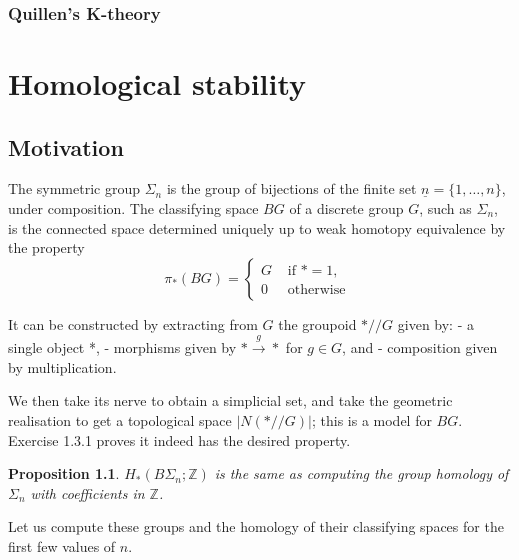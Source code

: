 \documentclass{book}
\newtheorem{prop}{Proposition}
\begin{document}
\section{Quillen's K-theory}


\part{Homological stability}
\chapter{Motivation}


\cite{kupersHomologicalStabilityMinicourse2021}

The symmetric group $\Sigma_n$ is the group of bijections of the finite set $\underline{n}=\{1, \ldots, n\}$, under composition. The classifying space $B G$ of a discrete group $G$, such as $\Sigma_n$, is the connected space determined uniquely up to weak homotopy equivalence by the property
$$
\pi_*(B G)= \begin{cases}G & \text { if } *=1, \\ 0 & \text { otherwise }\end{cases}
$$

It can be constructed by extracting from $G$ the groupoid $* / / G$ given by:
- a single object *,
- morphisms given by $* \xrightarrow{g} *$ for $g \in G$, and
- composition given by multiplication.

We then take its nerve to obtain a simplicial set, and take the geometric realisation to get a topological space $|N(* / / G)|$; this is a model for $B G$. Exercise 1.3.1 proves it indeed has the desired property.


\begin{prop}
    $H_*\left(B \Sigma_n ; \mathbb{Z}\right)$  is the same as computing the group homology of $\Sigma_n$ with coefficients in $\mathbb{Z}$.
\end{prop}
Let us compute these groups and the homology of their classifying spaces for the first few values of $n$.
\end{document}
